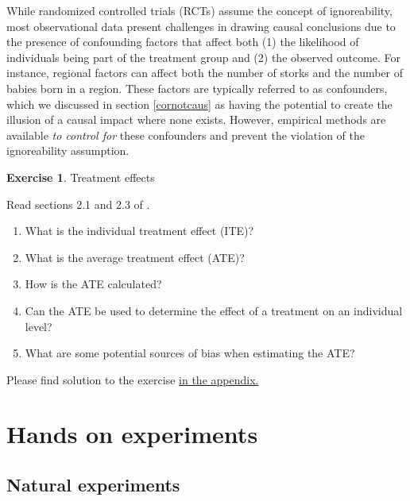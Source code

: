 \documentclass[
  12pt,
  oneside]{book}
\providecommand{\tightlist}{%
  \setlength{\itemsep}{0pt}\setlength{\parskip}{0pt}}
\theoremstyle{definition}
\theoremstyle{definition}
\theoremstyle{definition}
\newtheorem{exercise}{Exercise}[chapter]
\theoremstyle{definition}
\theoremstyle{remark}
\begin{document}
While randomized controlled trials (RCTs) assume the concept of ignoreability, most observational data present challenges in drawing causal conclusions due to the presence of confounding factors that affect both (1) the likelihood of individuals being part of the treatment group and (2) the observed outcome. For instance, regional factors can affect both the number of storks and the number of babies born in a region. These factors are typically referred to as confounders, which we discussed in section \ref{cornotcaus} as having the potential to create the illusion of a causal impact where none exists. However, empirical methods are available \emph{to control for} these confounders and prevent the violation of the ignoreability assumption.

\begin{exercise}
\protect\hypertarget{exr:treatmenteffects}{}\label{exr:treatmenteffects}Treatment effects

Read sections 2.1 and 2.3 of \citet{Neal2020Introduction}.

\begin{enumerate}
\def\labelenumi{\arabic{enumi}.}
\tightlist
\item
  What is the individual treatment effect (ITE)?
\item
  What is the average treatment effect (ATE)?
\item
  How is the ATE calculated?
\item
  Can the ATE be used to determine the effect of a treatment on an individual level?
\item
  What are some potential sources of bias when estimating the ATE?
\end{enumerate}

Please find solution to the exercise \protect\hyperlink{sol:treatmenteffects}{in the appendix.}
\end{exercise}

\hypertarget{hands-on-experiments}{%
\chapter{Hands on experiments}\label{hands-on-experiments}}

\hypertarget{natural-experiments}{%
\section{Natural experiments}\label{natural-experiments}}
\end{document}
